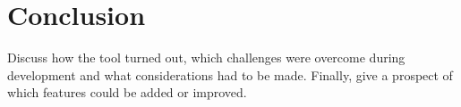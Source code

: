 \section{Conclusion}\label{conclusion}

Discuss how the tool turned out, which challenges were overcome during development and what considerations had to be made.
Finally, give a prospect of which features could be added or improved.